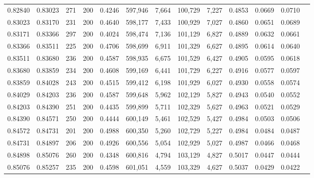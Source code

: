 \begin{tabular}{rrrrrrrrrrrrr}
0.82840 & 0.83023 &   271 & 200 &                                     0.4246 & 597,946 &   7,664 & 100,729 &   7,227 & 0.4853 & 0.0669 & 0.0710 \\
0.83023 & 0.83170 &   231 & 200 &                                     0.4640 & 598,177 &   7,433 & 100,929 &   7,027 & 0.4860 & 0.0651 & 0.0689 \\
0.83171 & 0.83366 &   297 & 200 &                                     0.4024 & 598,474 &   7,136 & 101,129 &   6,827 & 0.4889 & 0.0632 & 0.0661 \\
0.83366 & 0.83511 &   225 & 200 &                                     0.4706 & 598,699 &   6,911 & 101,329 &   6,627 & 0.4895 & 0.0614 & 0.0640 \\
0.83511 & 0.83680 &   236 & 200 &                                     0.4587 & 598,935 &   6,675 & 101,529 &   6,427 & 0.4905 & 0.0595 & 0.0618 \\
0.83680 & 0.83859 &   234 & 200 &                                     0.4608 & 599,169 &   6,441 & 101,729 &   6,227 & 0.4916 & 0.0577 & 0.0597 \\
0.83859 & 0.84028 &   243 & 200 &                                     0.4515 & 599,412 &   6,198 & 101,929 &   6,027 & 0.4930 & 0.0558 & 0.0574 \\
0.84029 & 0.84203 &   236 & 200 &                                     0.4587 & 599,648 &   5,962 & 102,129 &   5,827 & 0.4943 & 0.0540 & 0.0552 \\
0.84203 & 0.84390 &   251 & 200 &                                     0.4435 & 599,899 &   5,711 & 102,329 &   5,627 & 0.4963 & 0.0521 & 0.0529 \\
0.84390 & 0.84571 &   250 & 200 &                                     0.4444 & 600,149 &   5,461 & 102,529 &   5,427 & 0.4984 & 0.0503 & 0.0506 \\
0.84572 & 0.84731 &   201 & 200 &                                     0.4988 & 600,350 &   5,260 & 102,729 &   5,227 & 0.4984 & 0.0484 & 0.0487 \\
0.84731 & 0.84897 &   206 & 200 &                                     0.4926 & 600,556 &   5,054 & 102,929 &   5,027 & 0.4987 & 0.0466 & 0.0468 \\
0.84898 & 0.85076 &   260 & 200 &                                     0.4348 & 600,816 &   4,794 & 103,129 &   4,827 & 0.5017 & 0.0447 & 0.0444 \\
0.85076 & 0.85257 &   235 & 200 &                                     0.4598 & 601,051 &   4,559 & 103,329 &   4,627 & 0.5037 & 0.0429 & 0.0422 \\

\end{tabular}
